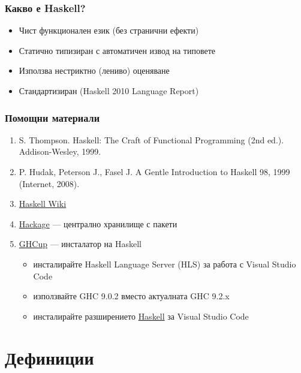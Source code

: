 \documentclass[alsotrans,beameroptions={aspectratio=169}]{beamerswitch}
\begin{document}
\lstset{basicstyle=\ttfamily}

\begin{frame}
  \frametitle{Какво е Haskell?}

  \pause
  \begin{itemize}
  \item Чист функционален език (без странични ефекти)
  \item Статично типизиран с автоматичен извод на типовете
  \item Използва нестриктно (лениво) оценяване
  \item Стандартизиран (Haskell 2010 Language Report)
  \end{itemize}
\end{frame}

\begin{frame}
  \frametitle{Помощни материали}

  \begin{enumerate}
  \item S. Thompson. Haskell: The Craft of Functional Programming (2nd ed.). Addison-Wesley, 1999.
  \item P. Hudak, Peterson J., Fasel J. A Gentle Introduction to Haskell 98, 1999 (Internet, 2008).
  \item \href{https://wiki.haskell.org/Haskell}{Haskell Wiki}
  \item \href{https://hackage.haskell.org/}{Hackage} --- централно хранилище с пакети
  \item \href{https://www.haskell.org/ghcup/}{GHCup} --- инсталатор на Haskell
    \begin{itemize}
    \item инсталирайте Haskell Language Server (HLS) за работа с Visual Studio Code
    \item използвайте GHC 9.0.2 вместо актуалната GHC 9.2.x
    \item инсталирайте разширението \href{https://marketplace.visualstudio.com/items?itemName=haskell.haskell}{Haskell} за Visual Studio Code
    \end{itemize}
  \end{enumerate}
\end{frame}

\section{Дефиниции}
\end{document}
